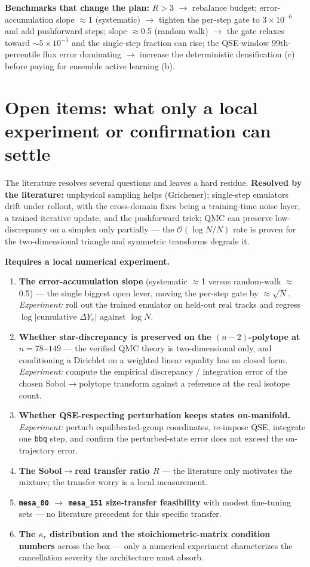 \documentclass[11pt]{article}
\newcommand{\bbq}{\texttt{bbq}}
\begin{document}
\textbf{Benchmarks that change the plan:} $R > 3$ $\to$ rebalance budget; error-accumulation slope $\approx$1 (systematic) $\to$ tighten the per-step gate to $3\times 10^{-6}$ and add pushforward steps; slope $\approx$0.5 (random walk) $\to$ the gate relaxes toward $\sim 5\times 10^{-5}$ and the single-step fraction can rise; the QSE-window 99th-percentile flux error dominating $\to$ increase the deterministic densification (c) before paying for ensemble active learning (b).

\section{Open items: what only a local experiment or confirmation can settle}

The literature resolves several questions and leaves a hard residue. \textbf{Resolved by the literature:} unphysical sampling helps (Grichener); single-step emulators drift under rollout, with the cross-domain fixes being a training-time noise layer, a trained iterative update, and the pushforward trick; QMC can preserve low-discrepancy on a simplex only partially --- the $\mathcal{O}(\log N / N)$ rate is proven for the two-dimensional triangle and symmetric transforms degrade it.

\textbf{Requires a local numerical experiment.}

\begin{enumerate}
\item \textbf{The error-accumulation slope} (systematic $\approx$1 versus random-walk $\approx$0.5) --- the single biggest open lever, moving the per-step gate by $\approx\sqrt{N}$. \emph{Experiment:} roll out the trained emulator on held-out real tracks and regress $\log|\text{cumulative }\Delta Y_e|$ against $\log N$.
\item \textbf{Whether star-discrepancy is preserved on the $(n-2)$-polytope at $n = 78$--$149$} --- the verified QMC theory is two-dimensional only, and conditioning a Dirichlet on a weighted linear equality has no closed form. \emph{Experiment:} compute the empirical discrepancy / integration error of the chosen Sobol$\to$polytope transform against a reference at the real isotope count.
\item \textbf{Whether QSE-respecting perturbation keeps states on-manifold.} \emph{Experiment:} perturb equilibrated-group coordinates, re-impose QSE, integrate one \bbq{} step, and confirm the perturbed-state error does not exceed the on-trajectory error.
\item \textbf{The Sobol$\to$real transfer ratio $R$} --- the literature only motivates the mixture; the transfer worry is a local measurement.
\item \textbf{\texttt{mesa\_80} $\to$ \texttt{mesa\_151} size-transfer feasibility} with modest fine-tuning sets --- no literature precedent for this specific transfer.
\item \textbf{The $\kappa_r$ distribution and the stoichiometric-matrix condition numbers} across the box --- only a numerical experiment characterizes the cancellation severity the architecture must absorb.
\end{enumerate}
\end{document}
